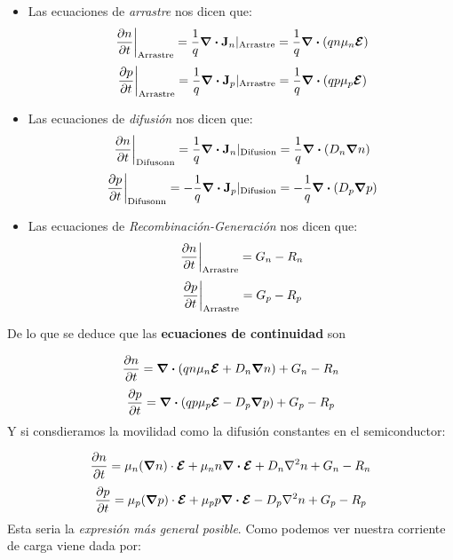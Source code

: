 \begin{itemize}
	\item Las ecuaciones de \textit{arrastre} nos dicen que:
	\begin{equation}
		\eval{\parciales{n}{t}}_{\text{Arrastre}} = \frac{1}{q} \div  \Jn_n |_{\text{Arrastre}} = \frac{1}{q} \div \parentesis{qn\mu_n \Encal}
	\end{equation}
	\begin{equation}
		\eval{\parciales{p}{t}}_{\text{Arrastre}} = \frac{1}{q} \div  \Jn_p|_{\text{Arrastre}} = \frac{1}{q} \div \parentesis{qp\mu_p \Encal}
	\end{equation}
	\item Las ecuaciones de \textit{difusión} nos dicen que:
	\begin{equation}
		\eval{\parciales{n}{t}}_{\text{Difusonn}} = \frac{1}{q} \div  \Jn_n|_{\text{Difusion}} = \frac{1}{q} \div \parentesis{D_n \grad n}
	\end{equation}
	\begin{equation}
		\eval{\parciales{p}{t}}_{\text{Difusonn}} = - \frac{1}{q} \div  \Jn_p|_{\text{Difusion}} = - \frac{1}{q} \div \parentesis{D_p\grad p}
	\end{equation}
	\item Las ecuaciones de \textit{Recombinación-Generación} nos dicen que:
	\begin{equation}
		\eval{\parciales{n}{t}}_{\text{Arrastre}} = G_n - R_n
	\end{equation}
	\begin{equation}
		\eval{\parciales{p}{t}}_{\text{Arrastre}} = G_p - R_p
	\end{equation}
\end{itemize}
De lo que se deduce que las \textbf{ecuaciones de continuidad} son

\begin{equation}
	\frac{\partial n}{\partial t}=\div \left( qn\mu_n \boldsymbol{\mathcal{E}} +  D_n \grad n   \right) + G_n - R_n
\end{equation}
\begin{equation}
	\frac{\partial p}{\partial t} = \div \left( qp\mu_p \boldsymbol{\mathcal{E}} - D_p \grad p   \right) + G_p - R_p
\end{equation}
Y si consdieramos la movilidad como la difusión constantes en el semiconductor:

\begin{equation}
	\frac{\partial n}{\partial t} = \mu_n (\grad n) \cdot \boldsymbol{\mathcal{E}} + \mu_n n \div \boldsymbol{\mathcal{E}} + D_n \nabla^2 n + G_n - R_n
\end{equation}
\begin{equation}
	\frac{\partial p}{\partial t} = \mu_p (\grad p) \cdot \boldsymbol{\mathcal{E}} + \mu_p p \div \boldsymbol{\mathcal{E}} - D_p \nabla^2 n + G_p - R_p
\end{equation}
Esta seria la \textit{expresión más general posible}. Como podemos ver nuestra corriente de carga viene dada por:

